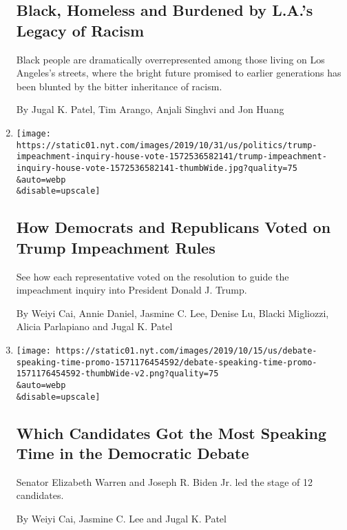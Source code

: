\begin{enumerate}
  \hypertarget{black-homeless-and-burdened-by-las-legacy-of-racism}{%
  \subsection{Black, Homeless and Burdened by L.A.'s Legacy of
  Racism}\label{black-homeless-and-burdened-by-las-legacy-of-racism}}

  Black people are dramatically overrepresented among those living on
  Los Angeles's streets, where the bright future promised to earlier
  generations has been blunted by the bitter inheritance of racism.

  By Jugal K. Patel, Tim Arango, Anjali Singhvi and Jon Huang
\item
  \href{/interactive/2019/10/31/us/politics/trump-impeachment-inquiry-house-vote.html}{}

  \texttt{[image: https://static01.nyt.com/images/2019/10/31/us/politics/trump-impeachment-inquiry-house-vote-1572536582141/trump-impeachment-inquiry-house-vote-1572536582141-thumbWide.jpg?quality=75\\\&auto=webp\\\&disable=upscale]}

  \hypertarget{how-democrats-and-republicans-voted-on-trump-impeachment-rules}{%
  \subsection{How Democrats and Republicans Voted on Trump Impeachment
  Rules}\label{how-democrats-and-republicans-voted-on-trump-impeachment-rules}}

  See how each representative voted on the resolution to guide the
  impeachment inquiry into President Donald J. Trump.

  By Weiyi Cai, Annie Daniel, Jasmine C. Lee, Denise Lu, Blacki
  Migliozzi, Alicia Parlapiano and Jugal K. Patel
\item
  \href{/interactive/2019/10/15/us/elections/debate-speaking-time.html}{}

  \texttt{[image: https://static01.nyt.com/images/2019/10/15/us/debate-speaking-time-promo-1571176454592/debate-speaking-time-promo-1571176454592-thumbWide-v2.png?quality=75\\\&auto=webp\\\&disable=upscale]}

  \hypertarget{which-candidates-got-the-most-speaking-time-in-the-democratic-debate}{%
  \subsection{Which Candidates Got the Most Speaking Time in the
  Democratic
  Debate}\label{which-candidates-got-the-most-speaking-time-in-the-democratic-debate}}

  Senator Elizabeth Warren and Joseph R. Biden Jr. led the stage of 12
  candidates.

  By Weiyi Cai, Jasmine C. Lee and Jugal K. Patel
\end{enumerate}

